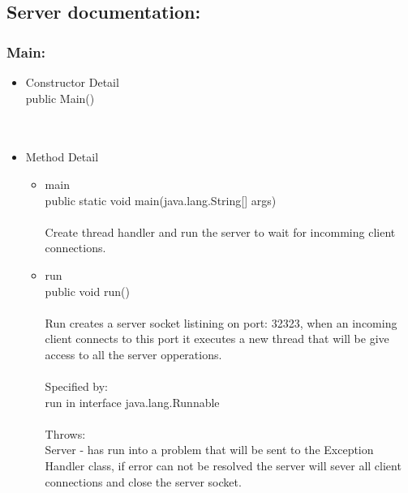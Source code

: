 \documentclass[letterpaper]{article}
\begin{document}
					\vspace{0.2in}
					\subsection*{Server documentation:}
					\vspace{0.1in}
					
						\subsubsection*{Main:}
						\vspace{0.1in}	
							\begin{itemize}
								\item	Constructor Detail \\
										public Main() \\ \\ \\
								\item	Method Detail
										\begin{itemize}
											\item	main \\
													public static void main(java.lang.String[] args) \\ \\
													Create thread handler and run the server to wait for incomming client connections.
											\item	run \\
													public void run() \\ \\
													Run creates a server socket listining on port: 32323, when an incoming client connects to this port it executes a new thread that will be give access to all the server opperations. \\ \\
													Specified by: \\
													run in interface java.lang.Runnable \\ \\
													Throws: \\
													Server - has run into a problem that will be sent to the Exception Handler class, if error can not be resolved the server will sever all client connections and close the server socket.
										\end{itemize}
							\end{itemize}
							
\end{document}
